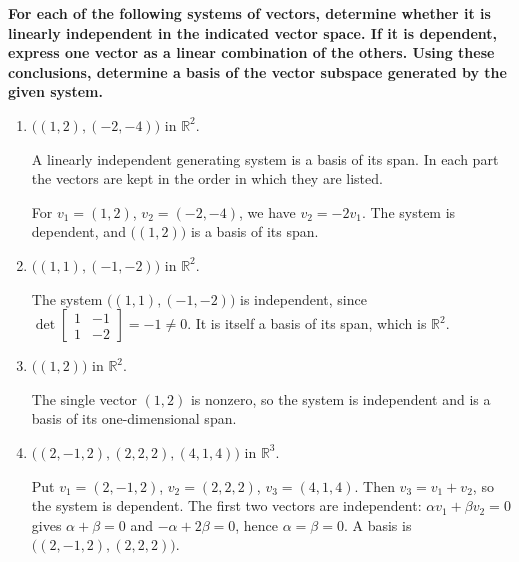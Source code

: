 \providecommand{\rank}{\operatorname{r}}
\providecommand{\RR}{\mathbb R}
\providecommand{\CC}{\mathbb C}
\providecommand{\KK}{\mathbb K}

\setcounter{enumi}{77}
\item {\bfseries\boldmath
For each of the following systems of vectors, determine whether it is linearly independent in the indicated vector space. If it is dependent, express one vector as a linear combination of the others. Using these conclusions, determine a basis of the vector subspace generated by the given system.
}

\begin{enumerate}[label=\alph*)]

\item $\bigl((1,2),(-2,-4)\bigr)$ in $\RR^2$.

\begin{answer}
A linearly independent generating system is a basis of its span.
In each part the vectors are kept in the order in which they are listed.

For $v_1=(1,2)$, $v_2=(-2,-4)$, we have $v_2=-2v_1$.
The system is dependent, and $\bigl((1,2)\bigr)$ is a basis of its span.
\end{answer}

\item $\bigl((1,1),(-1,-2)\bigr)$ in $\RR^2$.

\begin{answer}
The system $\bigl((1,1),(-1,-2)\bigr)$ is independent, since
$\det\begin{bmatrix}1&-1\\1&-2\end{bmatrix}=-1\ne0$.
It is itself a basis of its span, which is $\RR^2$.
\end{answer}

\item $\bigl((1,2)\bigr)$ in $\RR^2$.

\begin{answer}
The single vector $(1,2)$ is nonzero, so the system is independent
and is a basis of its one-dimensional span.
\end{answer}

\item $\bigl((2,-1,2),(2,2,2),(4,1,4)\bigr)$ in $\RR^3$.

\begin{answer}
Put $v_1=(2,-1,2)$, $v_2=(2,2,2)$, $v_3=(4,1,4)$.
Then $v_3=v_1+v_2$, so the system is dependent.
The first two vectors are independent: $\alpha v_1+\beta v_2=0$ gives
$\alpha+\beta=0$ and $-\alpha+2\beta=0$, hence $\alpha=\beta=0$.
A basis is $\bigl((2,-1,2),(2,2,2)\bigr)$.
\end{answer}


\end{enumerate}

